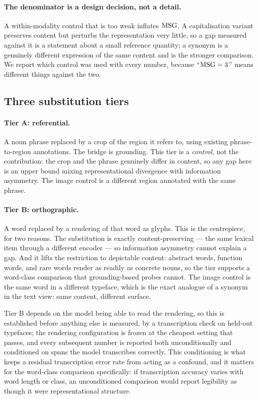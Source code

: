 \paragraph{The denominator is a design decision, not a detail.}
A within-modality control that is too weak inflates $\mathrm{MSG}$. A capitalisation
variant preserves content but perturbs the representation very little, so a gap
measured against it is a statement about a small reference quantity; a synonym is
a genuinely different expression of the same content and is the stronger
comparison. We report which control was used with every number, because
``$\mathrm{MSG} = 3$'' means different things against the two.

\subsection{Three substitution tiers}
\label{sec:tiers}

\paragraph{Tier A: referential.} A noun phrase replaced by a crop of the region
it refers to, using existing phrase-to-region annotations. The bridge is
grounding. This tier is a \emph{control}, not the contribution: the crop and the
phrase genuinely differ in content, so any gap here is an upper bound mixing
representational divergence with information asymmetry. The image control is a
different region annotated with the same phrase.

\paragraph{Tier B: orthographic.} A word replaced by a rendering of that word as
glyphs. This is the centrepiece, for two reasons. The substitution is exactly
content-preserving --- the same lexical item through a different encoder --- so
information asymmetry cannot explain a gap. And it lifts the restriction to
depictable content: abstract words, function words, and rare words render as
readily as concrete nouns, so the tier supports a word-class comparison that
grounding-based probes cannot. The image control is the same word in a different
typeface, which is the exact analogue of a synonym in the text view: same
content, different surface.

Tier B depends on the model being able to read the rendering, so this is
established before anything else is measured, by a transcription check on
held-out typefaces; the rendering configuration is frozen at the cheapest
setting that passes, and every subsequent number is reported both
unconditionally and conditioned on spans the model transcribes correctly. This
conditioning is what keeps a residual transcription error rate from acting as a
confound, and it matters for the word-class comparison specifically: if
transcription accuracy varies with word length or class, an unconditioned
comparison would report legibility as though it were representational structure.

